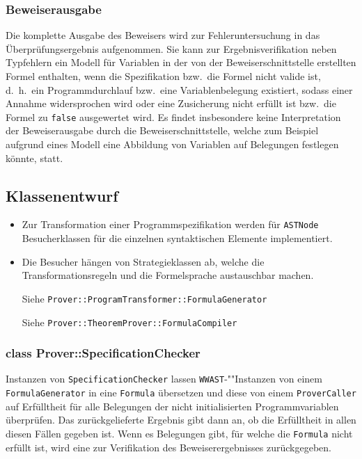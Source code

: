 \subsubsection{Beweiserausgabe}%

Die komplette Ausgabe des Beweisers wird zur Fehleruntersuchung in das
Überprüfungsergebnis aufgenommen. Sie kann zur Ergebnisverifikation
neben Typfehlern ein Modell für Variablen in der von der
Beweiserschnittstelle erstellten Formel enthalten, wenn die
Spezifikation bzw.\ die Formel nicht valide ist, d.~h.\ ein
Programmdurchlauf bzw.\ eine Variablenbelegung existiert, sodass einer
Annahme widersprochen wird oder eine Zusicherung nicht erfüllt ist
bzw.\ die Formel zu \texttt{false} ausgewertet wird. Es findet
insbesondere keine Interpretation der Beweiserausgabe durch die
Beweiserschnittstelle, welche zum Beispiel aufgrund eines Modell eine
Abbildung von Variablen auf Belegungen festlegen könnte, statt.%

\subsection{Klassenentwurf}%

\begin{itemize}%

    \item Zur Transformation einer Programmspezifikation werden für
    \texttt{ASTNode} Besucherklassen für die einzelnen syntaktischen
    Elemente implementiert.%

    \item Die Besucher hängen von Strategieklassen ab, welche die
    Transformationsregeln und die Formelsprache austauschbar machen.%

    Siehe \texttt{Prover::ProgramTransformer::FormulaGenerator}%

    Siehe \texttt{Prover::TheoremProver::FormulaCompiler}%


\end{itemize}%

\subsubsection{class Prover::SpecificationChecker}%


Instanzen von \texttt{SpecificationChecker} lassen
\texttt{WWAST}-""Instanzen von einem \texttt{FormulaGenerator} in eine
\texttt{Formula} übersetzen und diese von einem \texttt{ProverCaller}
auf Erfülltheit für alle Belegungen der nicht initialisierten
Programmvariablen überprüfen. Das zurückgelieferte Ergebnis gibt dann
an, ob die Erfülltheit in allen diesen Fällen gegeben ist. Wenn es
Belegungen gibt, für welche die \texttt{Formula} nicht erfüllt ist,
wird eine zur Verifikation des Beweiserergebnisses zurückgegeben.%


